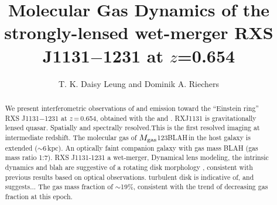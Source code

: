 \documentclass[]{emulateapj}
\begin{document}

\title{Molecular Gas Dynamics of the strongly-lensed wet-merger RXS J1131$-$1231 at $z$=0.654}
\author{T. K. Daisy Leung and Dominik A. Riechers}


\begin{abstract}
We present interferometric observations of \bco and \cco emission toward the ``Einstein ring''
RXS J1131$-$1231 at $z$\,=\,0.654, obtained with the \pdbi and \carma. 
RXJ1131 is gravitationally lensed quasar.
Spatially and spectrally resolved.This is the first resolved \bco imaging at intermediate redshift.
The molecular gas of $M_{\rm gas}$\eq123BLAH\,\Msun in the host galaxy 
is extended ($\sim$6\,kpc). An optically faint companion galaxy with gas mass BLAH (gas mass ratio 1:7). 
RXS J1131-1231 a wet-merger, 
Dynamical lens modeling, the intrinsic dynamics and blah are suggestive of a rotating disk morphology , consistent with previous results based on optical observations.
turbulent disk
is indicative of, and suggests...
The gas mass fraction of $\sim$19\%, consistent with the trend of decreasing gas fraction at this epoch.
\end{abstract}


\end{document}
